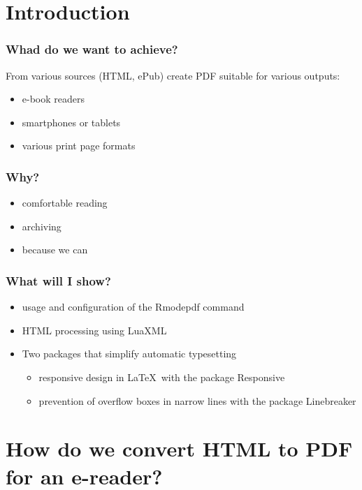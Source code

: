 \mode*
\section{Introduction}
\frenchspacing

\begin{frame}
  \frametitle{Whad do we want to achieve?}
    From various sources (HTML, ePub) create PDF suitable for various outputs:
    \begin{itemize}
      \item e-book readers
      \item smartphones or tablets
      \item various print page formats
    \end{itemize}

  \end{frame}
  \begin{frame}
    \frametitle{Why?}

    \begin{itemize}
      \item comfortable reading
      \item archiving
      \item because we can
    \end{itemize}


\end{frame}

\begin{frame}[fragile]
  \frametitle{What will I show?}
  \begin{itemize}
    \item usage and configuration of the Rmodepdf command
    \item HTML processing using LuaXML
    \item Two packages that simplify automatic typesetting
      \begin{itemize}
        \item responsive design in \LaTeX\ with the package Responsive
        \item prevention of overflow boxes in narrow lines with the package Linebreaker
      \end{itemize}

  \end{itemize}

\end{frame}


\section{How do we convert HTML to PDF for an e-reader?}

